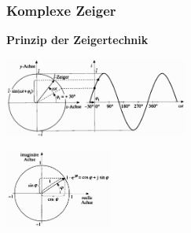 \subsubsection{Komplexe Zeiger}
	\begin{minipage}[t]{6cm}
	  	\textbf{Prinzip der Zeigertechnik}
    \end{minipage}
	\begin{minipage}{6cm}
       	\includegraphics[width=6cm]{bilder/RotierenderScheitelwertzeiger.png}
    \end{minipage}
	\begin{minipage}{3.5cm}
       	\includegraphics[width=3.5cm]{bilder/EulerscheRelation.png}
    \end{minipage} \\
